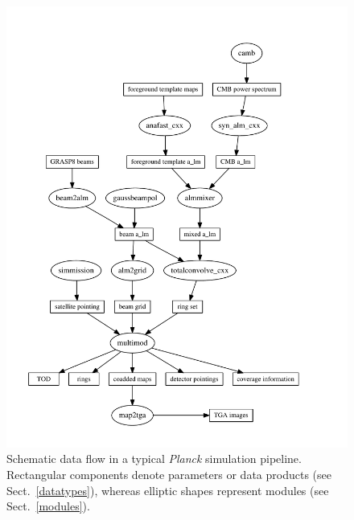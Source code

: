 \documentclass{aa}
\begin{document}
\begin{figure}
\centerline{\includegraphics[width=.45\textwidth]{pipeline}}
\caption{Schematic data flow in a typical \emph{Planck} simulation
  pipeline. Rectangular components denote parameters or data products
  (see Sect.~\ref{datatypes}), whereas elliptic shapes represent modules
  (see Sect.~\ref{modules}). }
\label{dataflow}
\end{figure}
\end{document}
